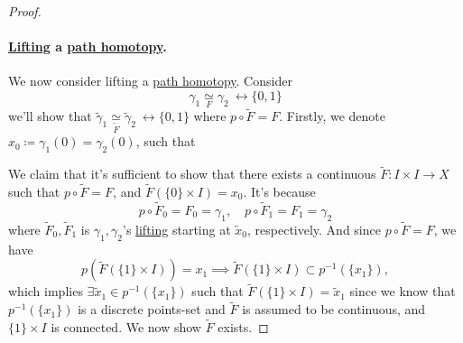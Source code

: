 \begin{proof}
	\paragraph{\hyperref[def:lift]{Lifting} a \hyperref[def:homotopy-path]{path homotopy}.} We now consider lifting a \hyperref[def:homotopy-path]{path homotopy}. Consider
	\[
		\gamma _1\underset{F}{\simeq } \gamma _2 \ \rel \{0, 1\}
	\]
	we'll show that \(\widetilde{\gamma}_1\underset{\widetilde{F} }{\simeq} \widetilde{\gamma}_2 \ \rel \{0, 1\}\) where \(p\circ \widetilde{F} = F\). Firstly,
	we denote \(x_0\coloneqq\gamma _1(0) = \gamma _2(0)\), such that
	\begin{figure}[H]
		\centering
		\label{fig:pf:col:lec14-4}
	\end{figure}
	We claim that it's sufficient to show that there exists a continuous \(\widetilde{F} \colon I\times I\to X\) such that \(p\circ \widetilde{F} = F\), and \(\widetilde{F} (\{0\}\times I)= x_0\).
	It's because
	\[
		p\circ \widetilde{F} _0 = F_0 = \gamma _1,\quad p\circ \widetilde{F} _1= F_1= \gamma _2
	\]
	where \(\widetilde{F} _0, \widetilde{F} _1\) is \(\gamma _1, \gamma _2\)'s \hyperref[prop:homotopy-lifting-property]{lifting} starting at \(\widetilde{x} _0\), respectively. And since
	\(p\circ\widetilde{F} = F\), we have
	\[
		p\left(\widetilde{F} (\{1\}\times I)\right) = x_1 \implies \widetilde{F} (\{1\}\times I)\subset p^{-1} (\{x_1\}),
	\]
	which implies \(\exists \widetilde{x} _1 \in p^{-1} (\{x_1\})\) such that \(\widetilde{F} (\{1\}\times I) = \widetilde{x} _1\) since we know that \(p^{-1} (\{x_1\})\) is a discrete
	points-set and \(\widetilde{F} \) is assumed to be continuous, and \(\{1\}\times I\) is connected. We now show \(\widetilde{F} \) exists.


\end{proof}
